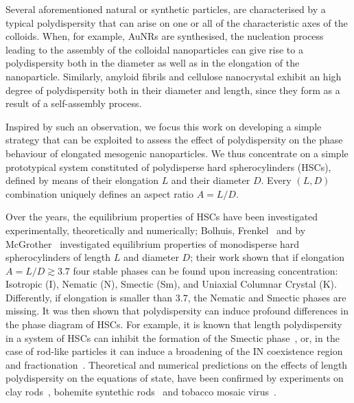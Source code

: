 \documentclass[journal=jacsat,manuscript=article]{achemso}
\begin{document}
Several aforementioned natural or synthetic particles, are characterised by a typical polydispersity that can arise on one or all of the characteristic axes of the colloids. When,  for example, AuNRs are synthesised,  the nucleation process leading to the assembly of the colloidal nanoparticles can give rise to a polydispersity both in the diameter as well as in the elongation of the nanoparticle. Similarly, amyloid fibrils and cellulose nanocrystal 
exhibit an high degree of polydispersity both in their diameter and length, since they form as a result of a self-assembly process. 

Inspired by such an observation, we focus this work on developing a simple strategy that can be exploited to assess the effect of polydispersity on the phase behaviour of  elongated mesogenic nanoparticles. We thus concentrate on a simple prototypical system constituted of polydisperse hard spherocylinders (HSCs), defined  by means of their elongation  $L$ and their diameter $D$. Every $(L,D)$ combination uniquely defines an aspect ratio $A=L/D$. 

Over the years, the equilibrium properties of HSCs  have been  investigated  experimentally, theoretically 
and numerically; Bolhuis, Frenkel~\cite{Bolhuis1997} and by McGrother~\cite{McGrother96} investigated equilibrium properties of monodisperse hard spherocylinders of length $L$ and diameter $D$; their work  shown that if elongation $A=L/D \gtrsim 3.7$ four stable phases can be found upon increasing concentration: Isotropic (I), Nematic (N), 
Smectic (Sm), and Uniaxial Columnar Crystal (K). Differently, if elongation is smaller than $3.7$,  the Nematic and Smectic phases 
are missing. 
It was then shown that polydispersity can induce profound differences in the phase diagram of HSCs. For example, 
it is known that  length polydispersity in a system of HSCs can inhibit the formation of 
the Smectic phase~\cite{Bates1998}, or, in the case of rod-like particles it can induce a broadening of the IN coexistence region and fractionation~\cite{Lekkerkerker1984,Speranza2002,Wensink2003}. 
Theoretical and numerical predictions on the effects of length polydispersity on the equations of state,  have been confirmed by experiments on clay rods~\cite{Woolston2015}, bohemite syntethic rods~\cite{Buining1993} and tobacco mosaic virus~\cite{Fraden1993}. 
\end{document}
